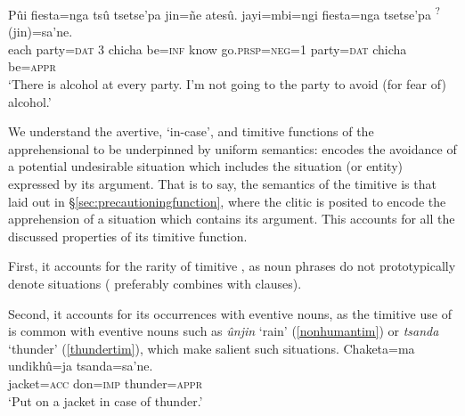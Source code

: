 \documentclass[output=paper,colorlinks,citecolor=brown]{langscibook}
\begin{document}
    \z
    \begin{exe}
    \ex \label{inantimtwo}
    \gll Pûi fiesta=nga   tsû tsetse'pa jin=ñe atesû. jayi=mbi=ngi     fiesta=nga   {\ob}tsetse'pa {\rm\textsuperscript{?}(}jin{\rm)}=sa'ne.{\cb} \\
         each  party=\textsc{dat} \textsc{3}  chicha    be=\textsc{inf} know  go.\textsc{prsp=neg=1} party=\textsc{dat} chicha             be=\textsc{appr} \\
    \glt `There is alcohol at every party. I'm not going to the party to avoid (for fear of) alcohol.'
\end{exe}

We understand the avertive, `in-case', and timitive functions of the apprehensional  to be underpinned by uniform semantics:  encodes the avoidance of a potential undesirable situation which includes the situation (or entity) expressed by its argument. That is to say, the semantics of the timitive is that laid out in \S\ref{sec:precautioningfunction}, where the clitic  is posited to encode the apprehension of a situation which contains its argument. This accounts for all the discussed properties of its timitive function.

First, it accounts for the rarity of timitive \sane, as noun phrases do not prototypically denote situations ( preferably combines with clauses).

Second, it accounts for its occurrences with eventive nouns, as the timitive use of  is common with eventive nouns such as \emph{ûnjin} `rain' (\ref{nonhumantim}) or \emph{tsanda} `thunder' (\ref{thundertim}), which make salient such situations.
        \ea \label{thundertim}
        \gll Chaketa=ma    undikhû=ja {\ob}tsanda=sa'ne.{\cb} \\
             jacket=\textsc{acc} don=\textsc{imp}   thunder=\textsc{appr} \\
        \glt `Put on a jacket in case of thunder.'
        \z 
\end{document}
